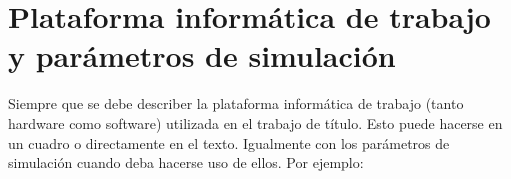 \begin{table}[H]
\centering
\caption{Comportamientos}
\label{tab: comportamientos}
\end{table}

\section{Plataforma informática de trabajo y parámetros de simulación}
Siempre que se debe describer la plataforma informática de trabajo (tanto hardware como software) utilizada en el trabajo de título. Esto puede hacerse en un cuadro o directamente en el texto. Igualmente con los parámetros de simulación cuando deba hacerse uso de ellos. Por ejemplo:


